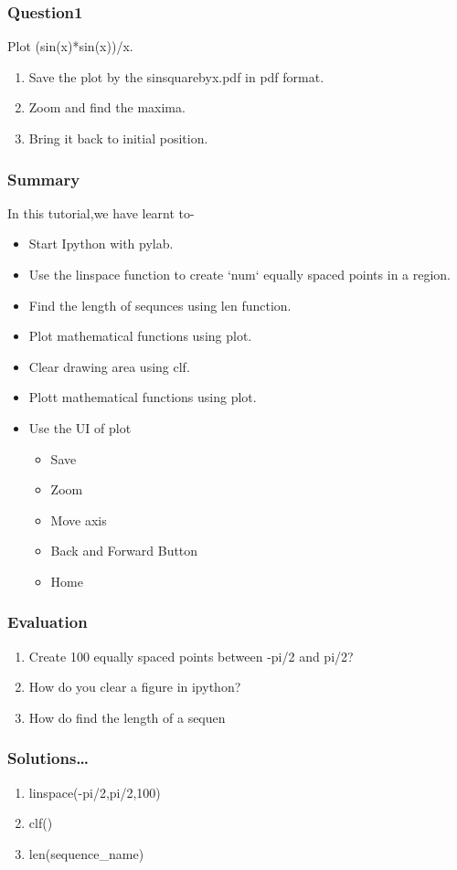 \documentclass[presentation]{beamer}
\begin{document}
\begin{frame}
\frametitle{Question1}
\label{sec-5}

  Plot (sin(x)*sin(x))/x.

\begin{enumerate}
\item Save the plot by the sinsquarebyx.pdf in pdf format.
\item Zoom and find the maxima.
\item Bring it back to initial position.
\end{enumerate}
\end{frame}
\begin{frame}
\frametitle{Summary}
\label{sec-6}

  In this tutorial,we have learnt to-

\begin{itemize}
\item Start Ipython with pylab.
\item Use the linspace function to create `num` equally spaced points in a region.
\item Find the length of sequnces using len function.
\item Plot mathematical functions using plot.
\item Clear drawing area using clf.
\item Plott mathematical functions using plot.
\item Use the UI of plot
\begin{itemize}
\item Save
\item Zoom
\item Move axis
\item Back and Forward Button
\item Home
\end{itemize}
\end{itemize}
 
\end{frame}
\begin{frame}
\frametitle{Evaluation}
\label{sec-7}


\begin{enumerate}
\item Create 100 equally spaced points between -pi/2 and pi/2?
\item How do you clear a figure in ipython?
\item How do find the length of a sequen
\end{enumerate}
\end{frame}
\begin{frame}
\frametitle{Solutions\ldots{}}
\label{sec-8}


\begin{enumerate}
\item linspace(-pi/2,pi/2,100)
\item clf()
\item len(sequence\_name)
\end{enumerate}
\end{frame}
\end{document}
